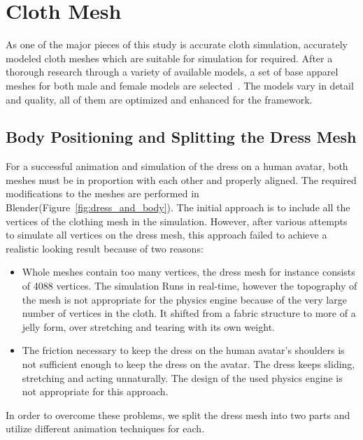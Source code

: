 \section{Cloth Mesh}
\label{section_cloth_mesh}

As one of the major pieces of this study is accurate cloth simulation, accurately modeled cloth meshes which are suitable for simulation for required. After a thorough research through a variety of available models, a set of base apparel meshes for both male and female models are selected~\cite{LadyJewell2012,3dregenerator2013,Axel2013,Borodin2013,PS3D2013,Alperin2013}. The models vary in detail and quality, all of them are optimized and enhanced for the framework. 

\subsection{Body Positioning and Splitting the Dress Mesh}

For a successful animation and simulation of the dress on a human avatar, both meshes must be in proportion with each other and properly aligned. The required modifications to the meshes are performed in Blender(Figure~\ref{fig:dress_and_body}). The initial approach is to include all the vertices of the clothing mesh in the simulation. However, after various attempts to simulate all vertices on the dress mesh, this approach failed to achieve a realistic looking result because of two reasons:
\begin{itemize}
\item Whole meshes contain too many vertices, the dress mesh for instance consists of 4088 vertices. The simulation Runs in real-time, however the topography of the mesh is not appropriate for the physics engine because of the very large number of vertices in the cloth. It shifted from a fabric structure to more of a jelly form, over stretching and tearing with its own weight.
\item The friction necessary to keep the dress on the human avatar's shoulders is not sufficient enough to keep the dress on the avatar. The dress keeps sliding, stretching and acting unnaturally. The design of the used physics engine is not appropriate for this approach.
\end{itemize}

In order to overcome these problems, we split the dress mesh into two parts and utilize different animation techniques for each.

